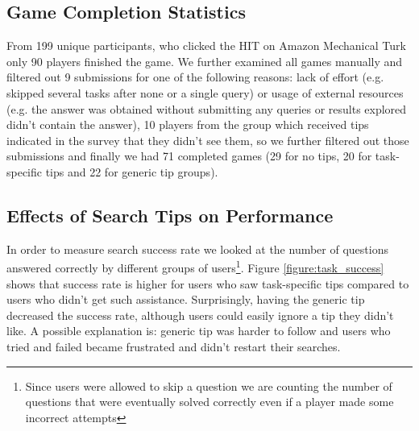 \documentclass{sig-alternate}
\begin{document}
\subsection{Game Completion Statistics}

From 199 unique participants, who clicked the HIT on Amazon Mechanical Turk only 90 players finished the game.
We further examined all games manually and filtered out 9 submissions for one of the following reasons: lack of effort (e.g. skipped several tasks after none or a single query) or usage of external resources (e.g. the answer was obtained without submitting any queries or results explored didn't contain the answer), 
10 players from the group which received tips indicated in the survey that they didn't see them, so we further filtered out those submissions and finally we had 71 completed games (29 for no tips, 20 for task-specific tips and 22 for generic tip groups).

\vspace{-1mm}
\subsection{Effects of Search Tips on Performance}

In order to measure search success rate we looked at the number of questions answered correctly by different groups of users\footnote{Since users were allowed to skip a question we are counting the number of questions that were eventually solved correctly even if a player made some incorrect attempts}.
Figure \ref{figure:task_success} shows that success rate is higher for users who saw task-specific tips compared to users who didn't get such assistance.
Surprisingly, having the generic tip decreased the success rate, although users could easily ignore a tip they didn't like.
A possible explanation is: generic tip was harder to follow and users who tried and failed became frustrated and didn't restart their searches.

\end{document}
